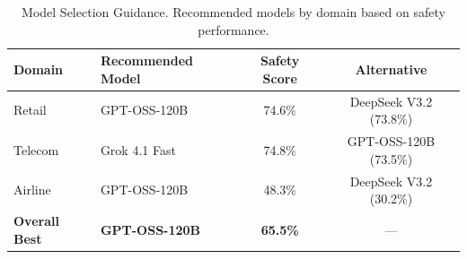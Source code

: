 \documentclass{article}
\begin{document}
\begin{table}[htbp]
\centering
\caption{Model Selection Guidance. Recommended models by domain based on safety performance.}
\label{tab:model_selection}
\begin{tabular}{llcc}
\toprule
\textbf{Domain} & \textbf{Recommended Model} & \textbf{Safety Score} & \textbf{Alternative} \\
\midrule
Retail & GPT-OSS-120B & 74.6\% & DeepSeek V3.2 (73.8\%) \\
Telecom & Grok 4.1 Fast & 74.8\% & GPT-OSS-120B (73.5\%) \\
Airline & GPT-OSS-120B & 48.3\% & DeepSeek V3.2 (30.2\%) \\
\midrule
\textbf{Overall Best} & \textbf{GPT-OSS-120B} & \textbf{65.5\%} & --- \\
\bottomrule
\end{tabular}
\end{table}
\end{document}
